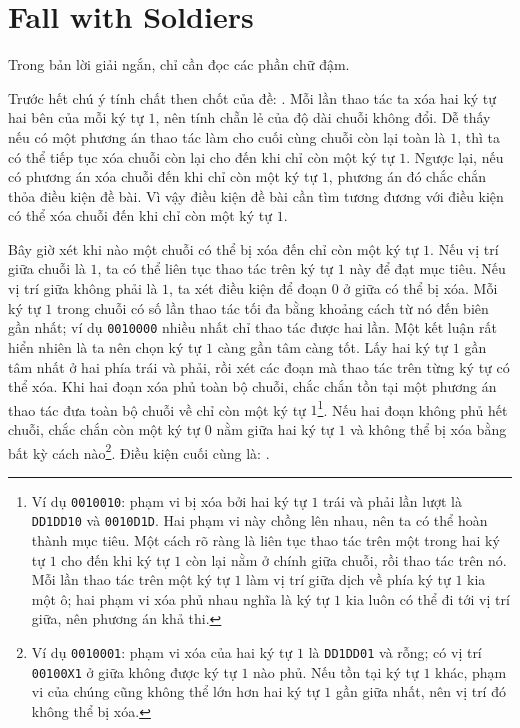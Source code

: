 \documentclass[11pt]{article}
\begin{document}
\section{Fall with Soldiers}

Trong bản lời giải ngắn, chỉ cần đọc các phần chữ đậm.

Trước hết chú ý tính chất then chốt của đề: . Mỗi
lần thao tác ta xóa hai ký tự hai bên của mỗi ký tự $1$, nên tính chẵn lẻ của
độ dài chuỗi không đổi. Dễ thấy nếu có một phương án thao tác làm cho cuối cùng
chuỗi còn lại toàn là $1$, thì ta có thể tiếp tục xóa chuỗi còn lại cho đến khi
chỉ còn một ký tự $1$. Ngược lại, nếu có phương án xóa chuỗi đến khi chỉ còn
một ký tự $1$, phương án đó chắc chắn thỏa điều kiện đề bài. Vì vậy điều kiện
đề bài cần tìm tương đương với điều kiện có thể xóa chuỗi đến khi chỉ còn một
ký tự $1$.

Bây giờ xét khi nào một chuỗi có thể bị xóa đến chỉ còn một ký tự $1$. Nếu vị
trí giữa chuỗi là $1$, ta có thể liên tục thao tác trên ký tự $1$ này để đạt
mục tiêu. Nếu vị trí giữa không phải là $1$, ta xét điều kiện để đoạn $0$ ở
giữa có thể bị xóa. Mỗi ký tự $1$ trong chuỗi có số lần thao tác tối đa bằng
khoảng cách từ nó đến biên gần nhất; ví dụ \texttt{0010000} nhiều nhất chỉ thao
tác được hai lần. Một kết luận rất hiển nhiên là ta nên chọn ký tự $1$ càng gần
tâm càng tốt. Lấy hai ký tự $1$ gần tâm nhất ở hai phía trái và phải, rồi xét
các đoạn mà thao tác trên từng ký tự có thể xóa. Khi hai đoạn xóa phủ toàn bộ
chuỗi, chắc chắn tồn tại một phương án thao tác đưa toàn bộ chuỗi về chỉ còn
một ký tự $1$\footnote{Ví dụ \texttt{0010010}: phạm vi bị xóa bởi hai ký tự
$1$ trái và phải lần lượt là \texttt{DD1DD10} và \texttt{0010D1D}. Hai phạm vi
này chồng lên nhau, nên ta có thể hoàn thành mục tiêu. Một cách rõ ràng là
liên tục thao tác trên một trong hai ký tự $1$ cho đến khi ký tự $1$ còn lại
nằm ở chính giữa chuỗi, rồi thao tác trên nó. Mỗi lần thao tác trên một ký tự
$1$ làm vị trí giữa dịch về phía ký tự $1$ kia một ô; hai phạm vi xóa phủ nhau
nghĩa là ký tự $1$ kia luôn có thể đi tới vị trí giữa, nên phương án khả thi.}.
Nếu hai đoạn không phủ hết chuỗi, chắc chắn còn một ký tự $0$ nằm giữa hai ký
tự $1$ và không thể bị xóa bằng bất kỳ cách nào\footnote{Ví dụ \texttt{0010001}:
phạm vi xóa của hai ký tự $1$ là \texttt{DD1DD01} và rỗng; có vị trí
\texttt{00100X1} ở giữa không được ký tự $1$ nào phủ. Nếu tồn tại ký tự $1$
khác, phạm vi của chúng cũng không thể lớn hơn hai ký tự $1$ gần giữa nhất, nên
vị trí đó không thể bị xóa.}. Điều kiện cuối cùng là: .
\end{document}
